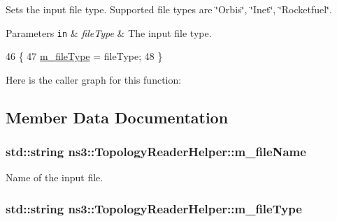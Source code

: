 Sets the input file type. Supported file types are \char`\"{}\+Orbis\char`\"{}, \char`\"{}\+Inet\char`\"{}, \char`\"{}\+Rocketfuel\char`\"{}. 


\begin{DoxyParams}[1]{Parameters}
\mbox{\tt in}  & {\em file\+Type} & The input file type. \\
\hline
\end{DoxyParams}

\begin{DoxyCode}
46 \{
47   \hyperlink{classns3_1_1TopologyReaderHelper_ac697b493772e6c2d6dc07da6c27a9eca}{m\_fileType} = fileType;
48 \}
\end{DoxyCode}


Here is the caller graph for this function\+:




\subsection{Member Data Documentation}
\subsubsection[{\texorpdfstring{m\+\_\+file\+Name}{m_fileName}}]{\setlength{\rightskip}{0pt plus 5cm}std\+::string ns3\+::\+Topology\+Reader\+Helper\+::m\+\_\+file\+Name\hspace{0.3cm}{\ttfamily [private]}}\hypertarget{classns3_1_1TopologyReaderHelper_a2b639a9c4ff3dca388c8060d3512b264}{}\label{classns3_1_1TopologyReaderHelper_a2b639a9c4ff3dca388c8060d3512b264}


Name of the input file. 

\subsubsection[{\texorpdfstring{m\+\_\+file\+Type}{m_fileType}}]{\setlength{\rightskip}{0pt plus 5cm}std\+::string ns3\+::\+Topology\+Reader\+Helper\+::m\+\_\+file\+Type\hspace{0.3cm}{\ttfamily [private]}}\hypertarget{classns3_1_1TopologyReaderHelper_ac697b493772e6c2d6dc07da6c27a9eca}{}\label{classns3_1_1TopologyReaderHelper_ac697b493772e6c2d6dc07da6c27a9eca}


